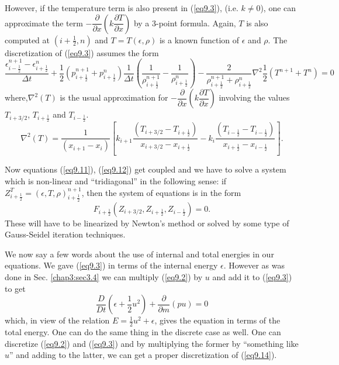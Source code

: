 However, if the temperature term is also present in (\ref{eq9.3}),
(i.e. $k \neq 0$), one can approximate the term
$-\dfrac{\partial}{\partial x} \left(k \dfrac{\partial T}{\partial x}\right)$ by
a 3-point formula. Again, $T$ is also computed at
$\left(i+\frac{1}{2}, n\right)$ 
and $T = T (\epsilon, \rho)$ is a known function of $\epsilon $ and
$\rho$. The discretization of (\ref{eq9.3}) assumes the form 
{\fontsize{10}{12}\selectfont
\begin{equation*}
\frac{\epsilon^{n+1}_{i-\frac{1}{2}} -
  \epsilon^n_{i+\frac{1}{2}}}{\Delta t} + \frac{1}{2}
(p^{n+1}_{i+\frac{1}{2}}  + p^n_{i+\frac{1}{2}})  \frac{1}{\Delta t}
(\frac{1}{\rho^{n+1}_{i+\frac{1}{2}}} -
\frac{1}{\rho^n_{i+\frac{1}{2}}}) -
\frac{2}{\rho^{n+1}_{i+\frac{1}{2}} + \rho^n_{i+\frac{1}{2}}} \nabla^2
\frac{1}{2} (T^{n+1} + T^n)= 0 \tag{9.12}\label{eq9.12} 
\end{equation*}}
where,\pageoriginale $\nabla^2 (T)$ is the usual approximation for
$-\dfrac{\partial}{\partial x} (k \dfrac{\partial T}{\partial x})$
involving the values $T_{i+3/2}$, $T_{i+\frac{1}{2}}$ and
$T_{i-\frac{1}{2}}$. 
\begin{equation*}
\nabla^2 (T) = \frac{1}{(x_{i+1} - x_i)} \left[k_{i+1} \frac{(T_{i+3/2} - T_{i+\frac{1}{2}})}{x_{i+3/2} - x_{i+\frac{1}{2}}} - k_i \frac{(T_{i-\frac{1}{2}} - T_{i-\frac{1}{2}})}{x_{i+\frac{1}{2}} - x_{i-\frac{1}{2}}} \right]. \tag{9.13}\label{eq9.13}
\end{equation*}

Now equations (\ref{eq9.11}), (\ref{eq9.12}) get coupled and we have to solve a system which is non-linear and ``tridiagonal'' in the following sense: if $Z^T_{i+\frac{1}{2}} = (\epsilon, T, \rho)^{n+1}_{i+\frac{1}{2}}$, then the system of equations is in the form 
$$
F_{i+\frac{1}{2}} (Z_{i+3/2}, Z_{i+\frac{1}{2}}, Z_{i-\frac{1}{2}}) = 0. 
$$
These will have to be linearized by Newton's method or solved by some type of Gauss-Seidel iteration techniques.

We now say a few words about the use of internal and total energies in our equations. We gave (\ref{eq9.3}) in terms of the internal energy $\epsilon$. However as was done in Sec. \ref{chap3:sec3.4} we can multiply (\ref{eq9.2}) by $u$ and add it to (\ref{eq9.3}) to get
\begin{equation*}
\frac{D}{Dt} \left(\epsilon + \frac{1}{2} u^2\right) +
\frac{\partial}{\partial m} (pu) = 0 \tag{9.14}\label{eq9.14}
\end{equation*}
which, in view of the relation $E = \frac{1}{2}u^2 + \epsilon$, gives the equation in terms of the total energy. One can do the same thing in the discrete case as well. One can discretize (\ref{eq9.2}) and (\ref{eq9.3}) and by multiplying the former by ``something like $u$'' and adding to the latter, we can get a proper discretization of (\ref{eq9.14}).

